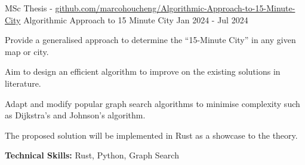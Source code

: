 
\begin{cventries}

  \cventry
    {MSc Thesis - \href{https://www.github.com/marcohoucheng/Algorithmic-Approach-to-15-Minute-City}{github.com/marcohoucheng/Algorithmic-Approach-to-15-Minute-City}} %
    {Algorithmic Approach to 15 Minute City} %
    {} %
    {Jan 2024 - Jul 2024} %
    {
      \begin{cvitems} %
        \item {Provide a generalised approach to determine the ``15-Minute City'' in any given map or city.}
        \item {Aim to design an efficient algorithm to improve on the existing solutions in literature.}
        \item {Adapt and modify popular graph search algorithms to minimise complexity such as Dijkstra's and Johnson's algorithm.}
        \item {The proposed solution will be implemented in Rust as a showcase to the theory.}
        \item {\textbf{Technical Skills:} Rust, Python, Graph Search}
      \end{cvitems}
    }

\end{cventries}

